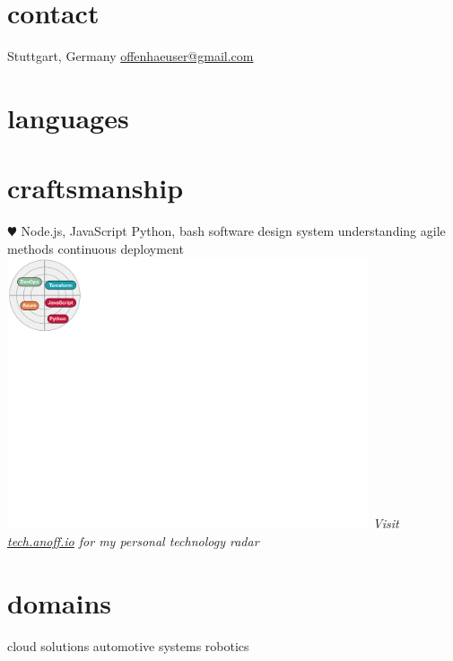 \documentclass[]{friggeri-cv} %
\begin{document}


\begin{aside} %
\section{\color{red}contact}
Stuttgart, Germany
\href{mailto:offenhaeuser@gmail.com}{offenhaeuser@gmail.com}
\section{\color{purple}languages}
\section{\color{green}craftsmanship}
{\color{red} $\varheartsuit$} Node.js, JavaScript
Python, bash
software design
system understanding
agile methods
continuous deployment
\hfill
\includegraphics[clip, width=0.8\textwidth, trim=0cm 19cm 28cm 0cm]{radar.pdf}
\textit{Visit \href{https://tech.anoff.io}{tech.anoff.io} for my personal technology radar}
\section{\color{blue}domains}
cloud solutions
automotive systems
robotics
\end{aside}
\end{document}
